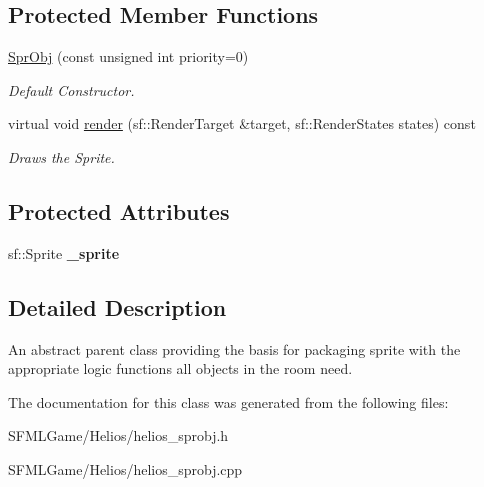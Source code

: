\subsection*{Protected Member Functions}
\begin{DoxyCompactItemize}
\item 
\hypertarget{class_helios_1_1_spr_obj_a25235d4dbfaeda9dfc1c157b2e6ebb05}{}\hyperlink{class_helios_1_1_spr_obj_a25235d4dbfaeda9dfc1c157b2e6ebb05}{Spr\+Obj} (const unsigned int priority=0)\label{class_helios_1_1_spr_obj_a25235d4dbfaeda9dfc1c157b2e6ebb05}

\begin{DoxyCompactList}\small\item\em Default Constructor. \end{DoxyCompactList}\item 
\hypertarget{class_helios_1_1_spr_obj_a9f21ff22d40d1f06dc58fbc9b2b16de7}{}virtual void \hyperlink{class_helios_1_1_spr_obj_a9f21ff22d40d1f06dc58fbc9b2b16de7}{render} (sf\+::\+Render\+Target \&target, sf\+::\+Render\+States states) const \label{class_helios_1_1_spr_obj_a9f21ff22d40d1f06dc58fbc9b2b16de7}

\begin{DoxyCompactList}\small\item\em Draws the Sprite. \end{DoxyCompactList}\end{DoxyCompactItemize}
\subsection*{Protected Attributes}
\begin{DoxyCompactItemize}
\item 
\hypertarget{class_helios_1_1_spr_obj_ad7a5db777d590b3835d9b0ec749a5292}{}sf\+::\+Sprite {\bfseries \+\_\+sprite}\label{class_helios_1_1_spr_obj_ad7a5db777d590b3835d9b0ec749a5292}

\end{DoxyCompactItemize}


\subsection{Detailed Description}
An abstract parent class providing the basis for packaging sprite with the appropriate logic functions all objects in the room need. 

The documentation for this class was generated from the following files\+:\begin{DoxyCompactItemize}
\item 
S\+F\+M\+L\+Game/\+Helios/helios\+\_\+sprobj.\+h\item 
S\+F\+M\+L\+Game/\+Helios/helios\+\_\+sprobj.\+cpp\end{DoxyCompactItemize}

